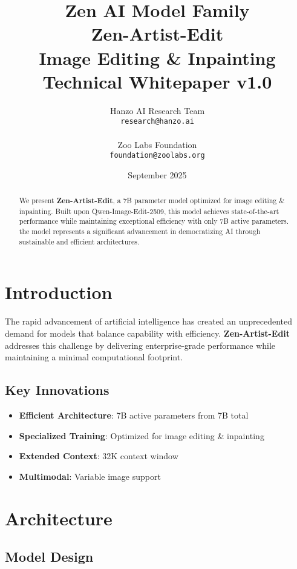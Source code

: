\documentclass[11pt,a4paper]{article}
\title{
    \vspace{-2cm}
    \Large \textbf{Zen AI Model Family} \\
    \vspace{0.5cm}
    \Huge \textbf{Zen-Artist-Edit} \\
    \vspace{0.3cm}
    \large Image Editing & Inpainting \\
    \vspace{0.5cm}
    \normalsize Technical Whitepaper v1.0
}
\author{
    Hanzo AI Research Team \\
    \texttt{research@hanzo.ai} \\
    \\
    Zoo Labs Foundation \\
    \texttt{foundation@zoolabs.org}
}
\date{September 2025}
\begin{document}
\maketitle

\begin{abstract}
We present \textbf{Zen-Artist-Edit}, a 7B parameter model optimized for image editing & inpainting. 
Built upon Qwen-Image-Edit-2509, this model achieves state-of-the-art performance while maintaining exceptional efficiency 
with only 7B active parameters. the model represents a significant advancement in democratizing AI through sustainable and efficient architectures.
\end{abstract}

\tableofcontents
\newpage

\section{Introduction}

The rapid advancement of artificial intelligence has created an unprecedented demand for models that balance capability with efficiency. 
\textbf{Zen-Artist-Edit} addresses this challenge by delivering enterprise-grade performance while maintaining a minimal computational footprint.

\subsection{Key Innovations}
\begin{itemize}
    \item \textbf{Efficient Architecture}: 7B active parameters from 7B total
    \item \textbf{Specialized Training}: Optimized for image editing & inpainting
    \item \textbf{Extended Context}: 32K context window
    
    \item \textbf{Multimodal}: Variable image support
    
\end{itemize}

\section{Architecture}

\subsection{Model Design}
\end{document}
